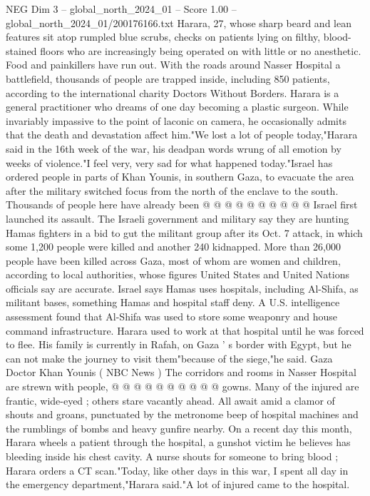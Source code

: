 \begin{textsample}{NEG Dim 3 – global\_north\_2024\_01 – Score 1.00 – global\_north\_2024\_01/200176166.txt}  \label{ex:f3_neg_232}
Harara, 27, whose sharp beard and lean features sit atop rumpled blue scrubs, checks on patients lying on filthy, blood-stained floors who are increasingly being operated on with little or no anesthetic.
Food and painkillers have run out.
With the roads around Nasser Hospital a battlefield, thousands of people are trapped inside, including 850 patients, according to the international charity Doctors Without Borders.
Harara is a general practitioner who dreams of one day becoming a plastic surgeon.
While invariably impassive to the point of laconic on camera, he occasionally admits that the death and devastation affect him."We lost a lot of people today,"Harara said in the 16th week of the war, his deadpan words wrung of all emotion by weeks of violence."I feel very, very sad for what happened today."Israel has ordered people in parts of Khan Younis, in southern Gaza, to evacuate the area after the military switched focus from the north of the enclave to the south.
Thousands of people here have already been @ @ @ @ @ @ @ @ @ @ Israel first launched its assault.
The Israeli government and military say they are hunting Hamas fighters in a bid to gut the militant group after its Oct. 7 attack, in which some 1,200 people were killed and another 240 kidnapped.
More than 26,000 people have been killed across Gaza, most of whom are women and children, according to local authorities, whose figures United States and United Nations officials say are accurate.
Israel says Hamas uses hospitals, including Al-Shifa, as militant bases, something Hamas and hospital staff deny.
A U.S. intelligence assessment found that Al-Shifa was used to store some weaponry and house command infrastructure.
Harara used to work at that hospital until he was forced to flee.
His family is currently in Rafah, on Gaza ' s border with Egypt, but he can not make the journey to visit them"because of the siege,"he said.
Gaza Doctor Khan Younis ( NBC News ) The corridors and rooms in Nasser Hospital are strewn with people, @ @ @ @ @ @ @ @ @ @ gowns.
Many of the injured are frantic, wide-eyed ; others stare vacantly ahead.
All await amid a clamor of shouts and groans, punctuated by the metronome beep of hospital machines and the rumblings of bombs and heavy gunfire nearby.
On a recent day this month, Harara wheels a patient through the hospital, a gunshot victim he believes has bleeding inside his chest cavity.
A nurse shouts for someone to bring blood ; Harara orders a CT scan."Today, like other days in this war, I spent all day in the emergency department,"Harara said."A lot of injured came to the hospital.

\end{textsample}
